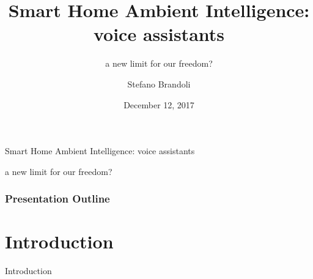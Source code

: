 \documentclass{beamer}
\title{Smart Home Ambient Intelligence: \\voice assistants}
\subtitle{\vspace*{0.3cm}a new limit for our freedom?}
\author[Stefano Brandoli]{Stefano Brandoli}
\institute[PoliMi]{Politecnico di Milano\\Computer Ethics 2017/2018}
\date{December 12, 2017}
\begin{document}
\begin{frame}
\maketitle
\end{frame}

\begin{frame}
\begin{center}\vspace*{-0.5cm}Smart Home Ambient Intelligence: voice assistants
	
a new limit for our freedom?
\end{center}
\frametitle{Presentation Outline}
\tableofcontents
\end{frame}

\section{Introduction}

\begin{frame}
\begin{center}
	 Introduction
\end{center}
\end{frame}
\end{document}
